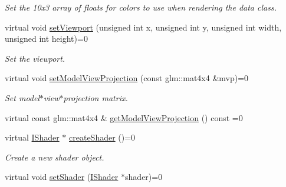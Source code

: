 \begin{DoxyCompactItemize}
\begin{DoxyCompactList}\small\item\em Set the 10x3 array of floats for colors to use when rendering the data class. \end{DoxyCompactList}\item 
virtual void \hyperlink{class_lots_of_lines_1_1_i_renderer_a4aa103c72ba9761bd035401bd744964f}{set\+Viewport} (unsigned int x, unsigned int y, unsigned int width, unsigned int height)=0\hypertarget{class_lots_of_lines_1_1_i_renderer_a4aa103c72ba9761bd035401bd744964f}{}\label{class_lots_of_lines_1_1_i_renderer_a4aa103c72ba9761bd035401bd744964f}

\begin{DoxyCompactList}\small\item\em Set the viewport. \end{DoxyCompactList}\item 
virtual void \hyperlink{class_lots_of_lines_1_1_i_renderer_ada3a02fd728d85fd3e16485dd0b10cf5}{set\+Model\+View\+Projection} (const glm\+::mat4x4 \&mvp)=0\hypertarget{class_lots_of_lines_1_1_i_renderer_ada3a02fd728d85fd3e16485dd0b10cf5}{}\label{class_lots_of_lines_1_1_i_renderer_ada3a02fd728d85fd3e16485dd0b10cf5}

\begin{DoxyCompactList}\small\item\em Set model$\ast$view$\ast$projection matrix. \end{DoxyCompactList}\item 
virtual const glm\+::mat4x4 \& \hyperlink{class_lots_of_lines_1_1_i_renderer_ac2c690247d805c68839ec7a831133665}{get\+Model\+View\+Projection} () const  =0
\item 
virtual \hyperlink{class_lots_of_lines_1_1_i_shader}{I\+Shader} $\ast$ \hyperlink{class_lots_of_lines_1_1_i_renderer_aa3d81559cc4d78fbf1dfdd85a7f34580}{create\+Shader} ()=0\hypertarget{class_lots_of_lines_1_1_i_renderer_aa3d81559cc4d78fbf1dfdd85a7f34580}{}\label{class_lots_of_lines_1_1_i_renderer_aa3d81559cc4d78fbf1dfdd85a7f34580}

\begin{DoxyCompactList}\small\item\em Create a new shader object. \end{DoxyCompactList}\item 
virtual void \hyperlink{class_lots_of_lines_1_1_i_renderer_a5ba7bf13e1fcdbfc7a8a0696a16b1a45}{set\+Shader} (\hyperlink{class_lots_of_lines_1_1_i_shader}{I\+Shader} $\ast$shader)=0\hypertarget{class_lots_of_lines_1_1_i_renderer_a5ba7bf13e1fcdbfc7a8a0696a16b1a45}{}\label{class_lots_of_lines_1_1_i_renderer_a5ba7bf13e1fcdbfc7a8a0696a16b1a45}


\end{DoxyCompactItemize}
